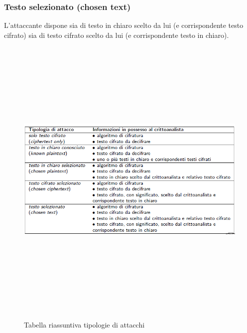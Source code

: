 \subsubsection{Testo selezionato (chosen text)}
L'attaccante dispone sia di testo in chiaro scelto da lui (e corrispondente testo cifrato) sia di testo cifrato scelto da lui (e corrispondente testo in chiaro).
\begin{figure}[htbp]
	\centering%
	\subfigure%
	{\includegraphics[height=14cm, width=15cm, keepaspectratio]{Immagini/Capitolo1/tab_attacchi_cifrari.png}}
	\caption{Tabella riassuntiva tipologie di attacchi \label{fig:tab_attacchi_cifrari}} 	
\end{figure}
